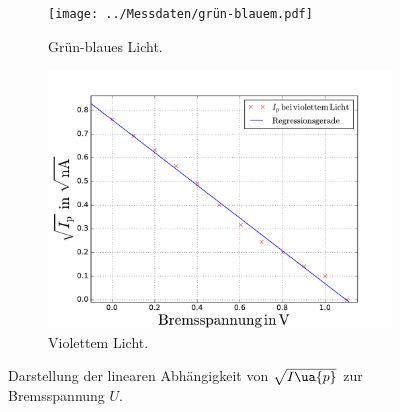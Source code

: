 \begin{figure}
  \centering
  \begin{subfigure}{0.48\textwidth}
    \centering
    \texttt{[image: ../Messdaten/grün-blauem.pdf]}
    \caption{Grün-blaues Licht.}
    \label{fig: grün-blau}
  \end{subfigure}
  \begin{subfigure}{0.48\textwidth}
    \centering
    \includegraphics[width=1 \textwidth]{../Messdaten/violettem.pdf}
    \caption{Violettem Licht.}
    \label{fig: violett}
  \end{subfigure}
  \caption{Darstellung der linearen Abhängigkeit von $\sqrt{I\ua{p}}$ zur Bremsspannung $U$.}
  \label{fig: darstellung_2}
\end{figure}
